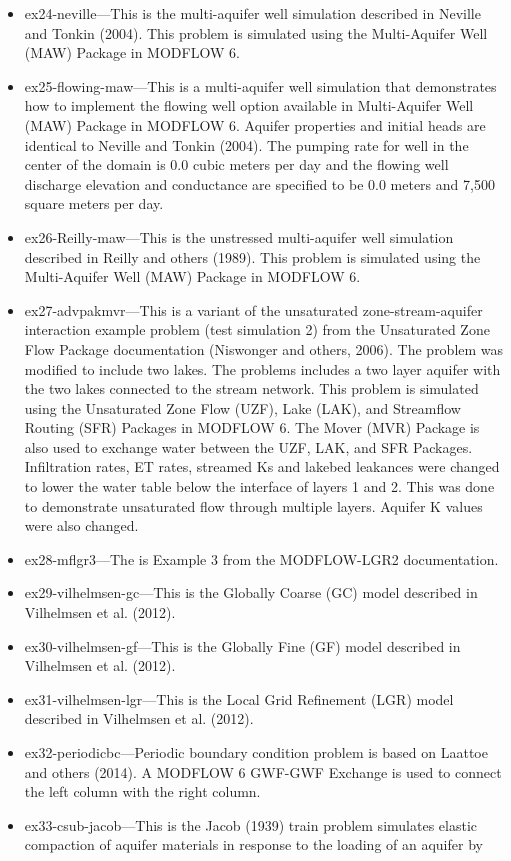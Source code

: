 \begin{itemize}
\item ex24-neville---This is the multi-aquifer well simulation described in Neville and Tonkin (2004).  This problem is simulated using the Multi-Aquifer Well (MAW) Package in MODFLOW 6.
\item ex25-flowing-maw---This is a multi-aquifer well simulation that demonstrates how to implement the flowing well option available in Multi-Aquifer Well (MAW) Package in MODFLOW 6. Aquifer properties and initial heads are identical to Neville and Tonkin (2004).  The pumping rate for well in the center of the domain is 0.0 cubic meters per day and the flowing well discharge elevation and conductance are specified to be 0.0 meters and 7,500 square meters per day.
\item ex26-Reilly-maw---This is the unstressed multi-aquifer well simulation described in Reilly and others (1989).  This problem is simulated using the Multi-Aquifer Well (MAW) Package in MODFLOW 6.
\item ex27-advpakmvr---This is a variant of the unsaturated zone-stream-aquifer interaction example problem (test simulation 2) from the Unsaturated Zone Flow Package documentation (Niswonger and others, 2006).  The problem was modified to include two lakes.  The problems includes a two layer aquifer with the two lakes connected to the stream network.  This problem is simulated using the Unsaturated Zone Flow (UZF), Lake (LAK), and Streamflow Routing (SFR) Packages in MODFLOW 6. The Mover (MVR) Package is also used to exchange water between the UZF, LAK, and SFR Packages. Infiltration rates, ET rates, streamed Ks and lakebed leakances were changed to lower the water table below the interface of layers 1 and 2. This was done to demonstrate unsaturated flow through multiple layers. Aquifer K values were also changed.
\item ex28-mflgr3---The is Example 3 from the MODFLOW-LGR2 documentation.
\item ex29-vilhelmsen-gc---This is the Globally Coarse (GC) model described in Vilhelmsen et al. (2012).
\item ex30-vilhelmsen-gf---This is the Globally Fine (GF) model described in Vilhelmsen et al. (2012).
\item ex31-vilhelmsen-lgr---This is the Local Grid Refinement (LGR) model described in Vilhelmsen et al. (2012).
\item ex32-periodicbc---Periodic boundary condition problem is based on Laattoe and others (2014). A MODFLOW 6 GWF-GWF Exchange is used to connect the left column with the right column. 
\item ex33-csub-jacob---This is the Jacob (1939) train problem simulates elastic compaction of aquifer materials in response to the loading of an aquifer by


\end{itemize}

